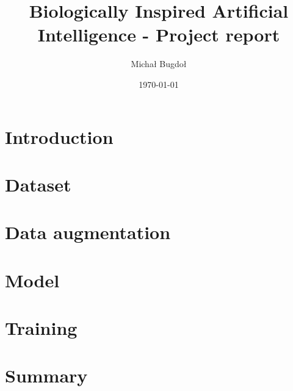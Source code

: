 \documentclass[12pt]{article}
\begin{document}
\title{Biologically Inspired Artificial Intelligence - Project report}
\author{Michał Bugdoł}
\date{\today}

\maketitle
\newpage

\tableofcontents
\newpage

\section{Introduction}


\section{Dataset}


\section{Data augmentation}


\section{Model}


\section{Training}


\section{Summary}

\end{document}

